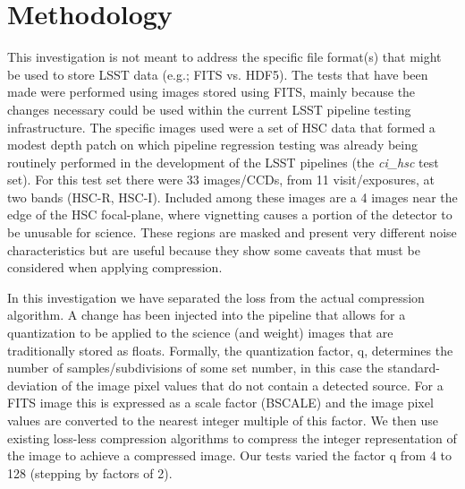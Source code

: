 \section{Methodology}

This investigation is not meant to address the specific file format(s) that might be
used to store LSST data (e.g.; FITS vs. HDF5).  The tests that have been made were performed
using images stored using FITS, mainly because the changes necessary could be used within 
the current LSST pipeline testing infrastructure.  The specific images used were a set of
HSC data that formed a modest depth patch on which pipeline regression testing was already 
being routinely performed in the development of the LSST pipelines (the {\it ci\_hsc} test set).  
For this test set there were 33 images/CCDs, from 11 visit/exposures, at two bands (HSC-R, HSC-I).
Included among these images are a 4 images near the edge of the HSC focal-plane, where 
vignetting causes a portion of the detector to be unusable for science.  These regions are 
masked and present very different noise characteristics but are useful because they show some 
caveats that must be considered when applying compression.

In this investigation we have separated the loss from the actual compression algorithm.
A change has been injected into the pipeline that allows for a quantization to be applied
to the science (and weight) images that are traditionally stored as floats.  Formally,
the quantization factor, q, determines the number of samples/subdivisions of some set
number, in this case the standard-deviation of the image pixel values that do not contain a 
detected source.  For a FITS image this is expressed as a scale factor (BSCALE) and the image 
pixel values are converted to the nearest integer multiple of this factor.  We then use existing
loss-less compression algorithms to compress the integer representation of the image
to achieve a compressed image.  Our tests varied the factor q from 4 to 128 (stepping by 
factors of 2).  

